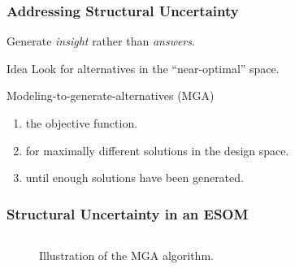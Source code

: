 


\begin{frame}
    \frametitle{Addressing Structural Uncertainty}
        \begin{block}{}
            \begin{center}
                Generate \textit{insight} rather than \textit{answers}.
            \end{center}
        \end{block}
        \begin{block}{Idea}
            Look for alternatives in the ``near-optimal'' space.            
        \end{block}

        \begin{block}{Modeling-to-generate-alternatives (MGA)}
            \begin{enumerate}
                \item {} the objective function.
                \item {} for maximally different solutions in the design space.
                \item {} until enough solutions have been generated.
            \end{enumerate}        
        \end{block}
\end{frame}

\begin{frame}
    \frametitle{Structural Uncertainty in an ESOM}

    \begin{columns}
        \column[t]{10cm}
        \begin{figure}
            \centering
            \resizebox{0.75\columnwidth}{!}{}
            \caption{Illustration of the MGA algorithm.}
            \label{fig:standard-mga}
        \end{figure}
    \end{columns}

\end{frame}

